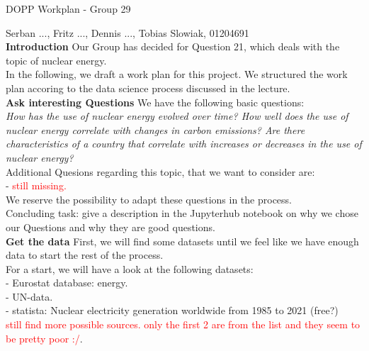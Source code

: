 \documentclass[a4paper,11pt]{article}
\begin{document}
\begin{center}
\begin{Large}
DOPP Workplan - Group 29\\
\end{Large} 
\end{center}

Serban ..., Fritz ..., Dennis ..., Tobias Slowiak, 01204691\\

\textbf{Introduction} Our Group has decided for Question 21, which deals with the topic of nuclear energy.\\
In the following, we draft a work plan for this project. We structured the work plan accoring to 
the data science process discussed in the lecture.\\

\textbf{Ask interesting Questions} We have the following basic questions:\\

\textit{How has the use of nuclear energy evolved over time? How well does the use of nuclear
energy correlate with changes in carbon emissions? Are there characteristics of a country
that correlate with increases or decreases in the use of nuclear energy?}\\

Additional Quesions regarding this topic, that we want to consider are:\\
- \textcolor{red}{still missing.}\\

We reserve the possibility to adapt these questions in the process.\\

Concluding task: give a description in the Jupyterhub notebook on why we chose our Questions and why they are good questions.\\

\textbf{Get the data} First, we will find some datasets until we feel like we have enough data to start the rest of the process.\\
For a start, we will have a look at the following datasets:\\
- Eurostat database: energy.\\
- UN-data.\\
- statista: Nuclear electricity generation worldwide from 1985 to 2021 (free?)\\
\textcolor{red}{still find more possible sources. only the first 2 are from the list and they seem to be pretty poor :/}.\\
\end{document}
